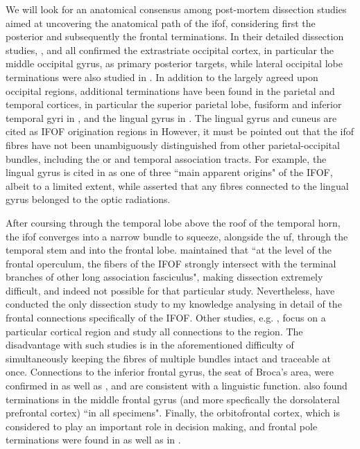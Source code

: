 We will look for an anatomical consensus among post-mortem dissection studies aimed at uncovering the anatomical path of the \gls{ifof}, considering first the posterior and subsequently the frontal terminations.
In their detailed dissection studies, \textcite{Martino2010}, and \textcite{Sarubbo2013} all confirmed the extrastriate occipital cortex, in particular the middle occipital gyrus, as primary posterior targets, while lateral occipital lobe terminations were also studied in \textcite{Palejwala2020}.
In addition to the largely agreed upon occipital regions, additional terminations have been found in the parietal and temporal cortices, in particular the superior parietal lobe, fusiform and inferior temporal gyri in \textcite{Martino2010}, and the lingual gyrus in \textcite{Sarubbo2013}.
The lingual gyrus and cuneus are cited as IFOF origination regions in \textcite{Palejwala2021}
However, it must be pointed out that the \gls{ifof} fibres have not been unambiguously distinguished from other parietal-occipital bundles, including the \gls{or} and temporal association tracts.
For example, the lingual gyrus is cited in \textcite{Sarubbo2013} as one of three ``main apparent origins" of the IFOF, albeit to a limited extent, while \textcite{Martino2010} asserted that any fibres connected to the lingual gyrus belonged to the optic radiations.

After coursing through the temporal lobe above the roof of the temporal horn,\autocite{Martino2010,Kljajevic2014a} the \gls{ifof} converges into a narrow bundle to squeeze, alongside the \gls{uf}, through the temporal stem and into the frontal lobe.\autocite{Martino2010,Sarubbo2013}
\textcite{Martino2010} maintained that ``at the level of the frontal operculum, the fibers of the IFOF strongly intersect with the terminal branches of other long association fasciculus", making dissection extremely difficult, and indeed not possible for that particular study.
Nevertheless, \textcite{Sarubbo2013} have conducted the only dissection study to my knowledge analysing in detail of the frontal connections specifically of the IFOF.
Other studies, e.g. \textcite{Burks2017}, focus on a particular cortical region and study all connections to the region.
The disadvantage with such studies is in the aforementioned difficulty of simultaneously keeping the fibres of multiple bundles intact and traceable at once.
Connections to the inferior frontal gyrus, the seat of Broca's area, were confirmed in \textcite{Sarubbo2013} as well as \textcite{Hau2016}, and are consistent with a linguistic function.
\textcite{Sarubbo2013} also found terminations in the middle frontal gyrus (and more specfically the dorsolateral prefrontal cortex) ``in all specimens".
Finally, the orbitofrontal cortex, which is considered to play an important role in decision making, and frontal pole terminations were found in \textcite{Sarubbo2013} as well as in \textcite{Burks2017}.

